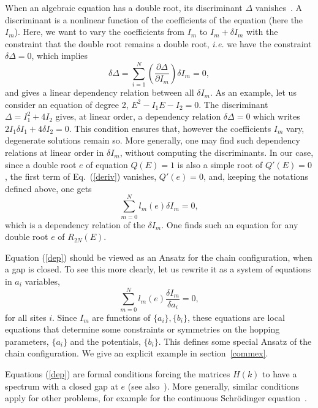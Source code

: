 \documentclass[]{revtex4-1}
\begin{document}
When an algebraic equation has a double root, its discriminant $\Delta$ vanishes~\cite{Irving}. A discriminant is a nonlinear function of the coefficients of the equation (here the $I_m$). Here, we want to vary the coefficients from $I_m$ to $I_m+\delta I_m$ with the constraint that the double root remains a double root, \textit{i.e.} we have the constraint $\delta \Delta=0$, which implies
\begin{equation}
\delta \Delta = \sum_{i=1}^{N} \left(\frac{\partial \Delta}{\partial I_m}\right) \delta I_m=0,
\end{equation}
and gives a linear dependency  relation between all $\delta I_m$. As an example, let us consider an equation of degree 2, $E^2-I_1E-I_2=0$. The discriminant $\Delta=I_1^2+4I_2$ gives, at linear order, a dependency relation $\delta \Delta=0$ which writes $ 2I_1 \delta I_1+ 4 \delta I_2=0$. This condition ensures that, however the coefficients $I_m$ vary, degenerate solutions remain so.
 More generally, one may find such dependency relations at linear order in $\delta I_m$, without computing the discriminants. In our case, 
since a double root $e$ of equation $Q(E)=1$ is also a simple root of $Q'(E)=0$, the first term of Eq.~(\ref{deriv}) vanishes, $Q'(e)=0$, and, keeping the notations defined above, one gets
\begin{equation}
  \sum_{m=0}^N l_m(e) \delta I_m =0, \label{dep}
\end{equation}
which is a dependency relation of the $\delta I_m$. One finds such an equation for any double root $e$ of $R_{2N}(E)$.

Equation (\ref{dep}) should be viewed as an Ansatz for the chain configuration, when a gap is closed. To see this more clearly, let us rewrite it as a system of equations in $a_i$ variables,
\begin{equation}
  \sum_{m=0}^N l_m(e) \frac{\delta I_m}{\delta a_i} =0, \label{dep1}
\end{equation}
for all sites $i$. Since $I_m$ are functions of $\{a_i\},\{b_i\}$, these equations are local equations that
determine some constraints or symmetries on the hopping parameters, $\{a_i\}$ and the potentials, $\{b_i\}$. This defines some special Ansatz of the chain configuration. We give an explicit example in section~\ref{commex}. 

Equations (\ref{dep}) are formal conditions forcing the matrices $H(k)$ to have a spectrum with a closed gap at $e$ (see also~\cite{Novikov,Dubrovin}).   More generally, similar conditions apply for other problems, for example for the continuous Schr\"odinger equation~\cite{notekdv0}.
\end{document}
